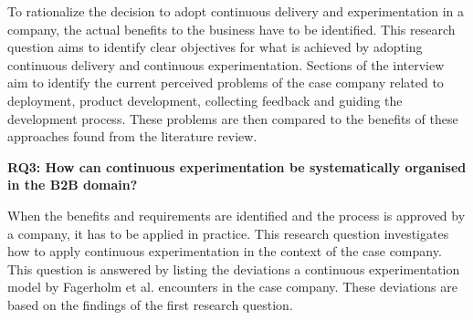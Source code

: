 \documentclass[english]{tktltiki2}
\theoremstyle{definition}
\theoremstyle{remark}
\begin{document}
\noindent To rationalize the decision to adopt continuous delivery and experimentation in a company, the actual benefits to the business have to be identified. This research question aims to identify clear objectives for what is achieved by adopting continuous delivery and continuous experimentation. Sections of the interview aim to identify the current perceived problems of the case company related to deployment, product development, collecting feedback and guiding the development process. These problems are then compared to the benefits of these approaches found from the literature review.
\newline




\noindent \textbf{RQ3: How can continuous experimentation be systematically organised in the B2B domain?}

\noindent When the benefits and requirements are identified and the process is approved by a company, it has to be applied in practice. This research question investigates how to apply continuous experimentation in the context of the case company. This question is answered by listing the deviations a continuous experimentation model by Fagerholm et al.\cite{fagerholm2014building} encounters in the case company. These deviations are based on the findings of the first research question. \newline
\end{document}
